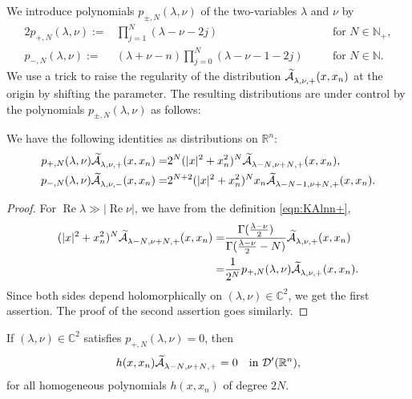 We introduce polynomials 
 $p_{\pm,N}(\lambda,\nu)$ of the two-variables $\lambda$ and $\nu$
 by 
\begin{alignat}{2}
p_{+,N}(\lambda,\nu):=& \prod_{j=1}^{N} (\lambda-\nu-2j)
\quad
&&\text{for $N \in {\mathbb{N}}_+$}, 
\label{eqn:p+N}
\\
p_{-,N}(\lambda,\nu):=& (\lambda+\nu-n)\prod_{j=0}^{N} (\lambda-\nu-1-2j)
\quad
&&\text{for $N \in {\mathbb{N}}$}.  
\label{eqn:p-N}
\end{alignat}
We use a trick to raise the regularity 
 of the distribution $\widetilde{{\mathcal{A}}}_{{\lambda},{\nu},{+}}^{{}}(x,x_n)$
 at the origin 
 by shifting the parameter.  
The resulting distributions are under control
 by the polynomials $p_{\pm,N}(\lambda,\nu)$ as follows:
\begin{lemma}
\label{lem:pAshift}
We have the following identities
 as distributions on ${\mathbb{R}}^n$:
\begin{align*}
p_{+,N}(\lambda, \nu) \widetilde{{\mathcal{A}}}_{{\lambda},{\nu},{+}}^{{}} (x,x_n)
=&
2^{N} (|x|^2+x_n^2)^N \widetilde{{\mathcal{A}}}_{{\lambda-N},{\nu+N},{+}}^{{}} (x,x_n), 
\\
p_{-,N}(\lambda, \nu) \widetilde{{\mathcal{A}}}_{{\lambda},{\nu},{-}}^{{}} (x,x_n)
=&
2^{N+2} (|x|^2+x_n^2)^N x_n \widetilde{{\mathcal{A}}}_{{\lambda-N-1},{\nu+N},{+}}^{{}} (x,x_n). 
\end{align*}
\end{lemma}

\begin{proof}
For $\operatorname{Re}\lambda \gg  |\operatorname{Re}\nu|$, 
 we have from the definition \eqref{eqn:KAlnn+}, 
\begin{align*}
  (|x|^2+ x_n^2)^N \widetilde{{\mathcal{A}}}_{{\lambda-N},{\nu+N},{+}}^{{}} (x,x_n)
=&
\frac{\Gamma(\frac{\lambda-\nu}{2})}{\Gamma(\frac{\lambda-\nu}{2}-N)}
\widetilde{{\mathcal{A}}}_{{\lambda},{\nu},{+}}^{{}} (x,x_n)
\\
=&
\frac{1}{2^N} p_{+,N}(\lambda,\nu) \widetilde{{\mathcal{A}}}_{{\lambda},{\nu},{+}}^{{}}(x,x_n).  
\end{align*}
Since both sides depend holomorphically on $(\lambda, \nu)\in {\mathbb{C}}^2$, 
 we get the first assertion.  
The proof of the second assertion goes similarly.  
\end{proof}

\begin{lemma}
\label{lem:1.16}
If $(\lambda,\nu) \in {\mathbb{C}}^2$ satisfies $p_{+,N}(\lambda, \nu)=0$, 
then 
\[
  h(x,x_n) \widetilde{{\mathcal{A}}}_{{\lambda-N},{\nu+N},{+}}^{{}}=0
\quad
 \text{in } {\mathcal{D}}'
   ({\mathbb{R}}^n), 
\]
for all homogeneous polynomials $h(x,x_n)$
 of degree $2N$.  
\end{lemma}

